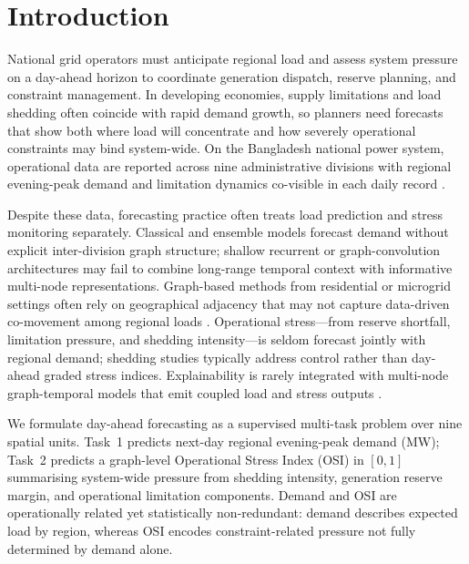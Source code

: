 \section{Introduction}\label{sec:introduction}

National grid operators must anticipate regional load and assess system pressure on a day-ahead horizon to coordinate generation dispatch, reserve planning, and constraint management. In developing economies, supply limitations and load shedding often coincide with rapid demand growth, so planners need forecasts that show both where load will concentrate and how severely operational constraints may bind system-wide. On the Bangladesh national power system, operational data are reported across nine administrative divisions with regional evening-peak demand and limitation dynamics co-visible in each daily record \cite{Hossain2025BangladeshSmartGrid}.

Despite these data, forecasting practice often treats load prediction and stress monitoring separately. Classical and ensemble models \cite{Breiman2001RandomForest,Chen2016XGBoost,Musbah2025LoadForecasting} forecast demand without explicit inter-division graph structure; shallow recurrent or graph-convolution architectures \cite{Hochreiter1997LSTM,Zhao2020TGCN} may fail to combine long-range temporal context with informative multi-node representations. Graph-based methods from residential or microgrid settings often rely on geographical adjacency that may not capture data-driven co-movement among regional loads \cite{Kipf2017GCN}. Operational stress---from reserve shortfall, limitation pressure, and shedding intensity---is seldom forecast jointly with regional demand; shedding studies \cite{Paphitis2025SpatialLoadShedding} typically address control rather than day-ahead graded stress indices. Explainability is rarely integrated with multi-node graph-temporal models that emit coupled load and stress outputs \cite{Baur2024XAIReview,Lundberg2017SHAP}.

We formulate day-ahead forecasting as a supervised multi-task problem \cite{Caruana1997Multitask} over nine spatial units. Task~1 predicts next-day regional evening-peak demand (MW); Task~2 predicts a graph-level Operational Stress Index (OSI) in $[0,1]$ summarising system-wide pressure from shedding intensity, generation reserve margin, and operational limitation components. Demand and OSI are operationally related yet statistically non-redundant: demand describes expected load by region, whereas OSI encodes constraint-related pressure not fully determined by demand alone.

